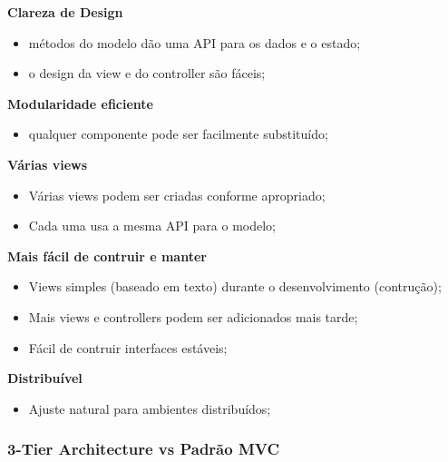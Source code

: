 \documentclass{article}
\begin{document}
\begin{flushleft}
  \textbf{Clareza de Design}
  \begin{itemize}
    \item métodos do modelo dão uma API para os dados e o estado;
    \item o design da view e do controller são fáceis; 
  \end{itemize}

  \textbf{Modularidade eficiente}
  \begin{itemize}
    \item qualquer componente pode ser facilmente substituído;
  \end{itemize}

  \textbf{Várias views}
  \begin{itemize}
    \item Várias views podem ser criadas conforme apropriado;
    \item Cada uma usa a mesma API para o modelo;
  \end{itemize}

  \textbf{Mais fácil de contruir e manter}
  \begin{itemize}
    \item Views simples (baseado em texto) durante o desenvolvimento (contrução);
    \item Mais views e controllers podem ser adicionados mais tarde;
    \item Fácil de contruir interfaces estáveis;
  \end{itemize}

  \textbf{Distribuível}
  \begin{itemize}
    \item Ajuste natural para ambientes distribuídos;
  \end{itemize}
\end{flushleft}

\pagebreak

\subsubsection{3-Tier Architecture vs Padrão MVC}
\end{document}
